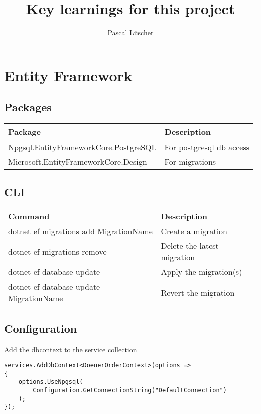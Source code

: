 \documentclass[12pt, a4paper]{article}
\title{Key learnings for this project}
\author{Pascal Lüscher}
\begin{document}
\maketitle
\tableofcontents{}

\section{Entity Framework}

\subsection{Packages}
\begin{table}[h!]
\centering
	\begin{tabular}{|l l|}
		\hline
		Package & Description \\
		\hline \hline
		Npgsql.EntityFrameworkCore.PostgreSQL & For postgresql db access \\
		
		Microsoft.EntityFrameworkCore.Design & For migrations \\
		\hline
	\end{tabular}
\end{table}

\subsection{CLI}

\begin{table}[h!]
\centering
	\begin{tabular}{|l l|}
		\hline
		Command & Description \\
		\hline \hline
		dotnet ef migrations add MigrationName & Create a migration \\
		dotnet ef migrations remove & Delete the latest migration \\
		\hline
		dotnet ef database update & Apply the migration(s) \\
		dotnet ef database update MigrationName & Revert the migration \\
		\hline
	\end{tabular}
\end{table}

\subsection{Configuration}
Add the dbcontext to the service collection

\begin{lstlisting}
services.AddDbContext<DoenerOrderContext>(options =>
{
	options.UseNpgsql(
		Configuration.GetConnectionString("DefaultConnection")
	);
});
\end{lstlisting}
\end{document}
